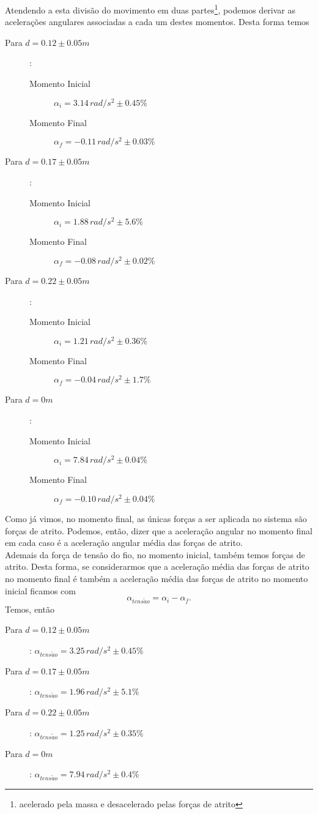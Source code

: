 \documentclass[11pt]{report}
\begin{document}
Atendendo a esta divisão do movimento em duas partes\footnote{acelerado pela massa e desacelerado pelas forças de atrito}, podemos derivar as acelerações angulares associadas a cada um destes momentos. Desta forma temos
\begin{description}
\item[Para $d=0.12\pm0.05 m $]:
\begin{description}
	\item[Momento Inicial] $\alpha_i = 3.14\, rad/s^2 \pm0.45\% $
	\item[Momento Final] $\alpha_f = -0.11\, rad/s^2\pm0.03\% $
\end{description}
\item[Para $d=0.17\pm0.05 m $]:
\begin{description}
	\item[Momento Inicial] $\alpha_i = 1.88\, rad/s^2 \pm5.6\%$
	\item[Momento Final] $\alpha_f =-0.08\, rad/s^2 \pm0.02\% $
\end{description}
\pagebreak
\item[Para $d=0.22\pm0.05 m $]:
\begin{description}
	\item[Momento Inicial] $\alpha_i = 1.21\,rad/s^2\pm0.36\%$
	\item[Momento Final] $\alpha_f = -0.04\,rad/s^2\pm1.7\% $
\end{description}
\item[Para $d=0 m $]:
\begin{description}
	\item[Momento Inicial] $\alpha_i = 7.84\,rad/s^2\pm0.04\%$
	\item[Momento Final] $\alpha_f =-0.10\,rad/s^2\pm0.04\%$
\end{description}
\end{description}

Como já vimos, no momento final, as únicas forças a ser aplicada no sistema são forças de atrito. Podemos, então, dizer que a aceleração angular no momento final em cada caso é a aceleração angular média das forças de atrito.\\
Ademais da força de tensão do fio, no momento inicial, também temos forças de atrito. Desta forma, se considerarmos que a aceleração média das forças de atrito no momento final é também a aceleração média das forças de atrito no momento inicial ficamos com $$\alpha_{tens\tilde{a}o}=\alpha_i-\alpha_f. $$
Temos, então \\
\begin{description}
\item[Para $d=0.12\pm0.05 m $]: $\alpha_{tens\tilde{a}o}= 3.25\,rad/s^2\pm0.45\%$
\item[Para $d=0.17\pm0.05 m $]: $\alpha_{tens\tilde{a}o}= 1.96\,rad/s^2\pm5.1\%$
\item[Para $d=0.22\pm0.05 m $]: $\alpha_{tens\tilde{a}o}= 1.25\,rad/s^2\pm0.35\%$
\item[Para $d=0 m $]: $\alpha_{tens\tilde{a}o}= 7.94\,rad/s^2\pm0.4\%$
\end{description}
\end{document}
